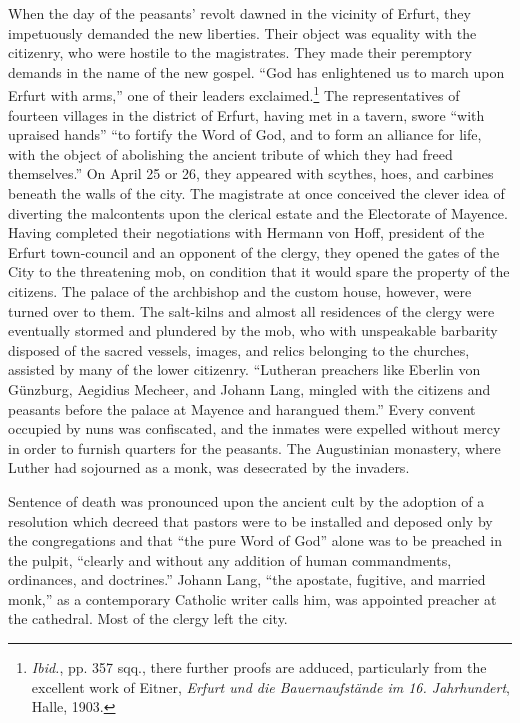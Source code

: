 When the day of the peasants’ revolt dawned in the vicinity of
Erfurt, they impetuously demanded the new liberties. Their object
was equality with the citizenry, who were hostile to the magistrates.
They made their peremptory demands in the name of the new
gospel. “God has enlightened us to march upon Erfurt with arms,”
one of their leaders exclaimed.\footnote
{\textit{Ibid.}, pp. 357 sqq., there further proofs are adduced, particularly from the excellent
work of Eitner, \textit{Erfurt und die Bauernaufstände im 16. Jahrhundert}, Halle, 1903.}
The representatives of fourteen
villages in the district of Erfurt, having met in a tavern, swore
“with upraised hands” “to fortify the Word of God, and to form
an alliance for life, with the object of abolishing the ancient tribute
of which they had freed themselves.” On April 25 or 26, they appeared
with scythes, hoes, and carbines beneath the walls of the
city. The magistrate at once conceived the clever idea of diverting
the malcontents upon the clerical estate and the Electorate of Mayence.
Having completed their negotiations with Hermann von Hoff, president
of the Erfurt town-council and an opponent of the clergy, they opened
the gates of the City to the threatening mob, on condition that it would
spare the property of the citizens. The palace of the archbishop and the
custom house, however, were turned over to them. The salt-kilns and almost
all residences of the clergy were eventually stormed and plundered by
the mob, who with unspeakable barbarity disposed of the sacred vessels,
images, and relics belonging to the churches, assisted by many of the
lower citizenry. ``Lutheran preachers like Eberlin von Günzburg, Aegidius
Mecheer, and Johann Lang, mingled with the citizens and peasants
before the palace at Mayence and harangued them.” Every convent
occupied by nuns was confiscated, and the inmates were expelled
without mercy in order to furnish quarters for the peasants. The
Augustinian monastery, where Luther had sojourned as a monk, was
desecrated by the invaders.

Sentence of death was pronounced upon the ancient cult by the
adoption of a resolution which decreed that pastors were to be installed
and deposed only by the congregations and that “the pure
Word of God” alone was to be preached in the pulpit, “clearly and
without any addition of human commandments, ordinances, and
doctrines.” Johann Lang, “the apostate, fugitive, and married monk,”
as a contemporary Catholic writer calls him, was appointed preacher
at the cathedral. Most of the clergy left the city.

